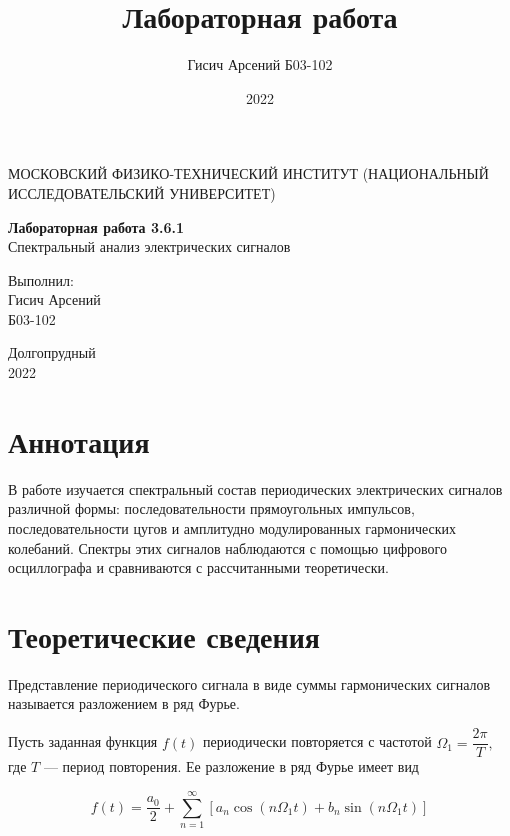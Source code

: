 \documentclass[a4paper, 12pt]{article}
\title{Лабораторная работа}
\author{Гисич Арсений Б03-102}
\date{2022}
\begin{document}
	\begin{center}
		{\large МОСКОВСКИЙ ФИЗИКО-ТЕХНИЧЕСКИЙ ИНСТИТУТ (НАЦИОНАЛЬНЫЙ ИССЛЕДОВАТЕЛЬСКИЙ УНИВЕРСИТЕТ)}
	\end{center}
	\vspace{5 cm}
	{\Large
		\begin{center}
			{\bf Лабораторная работа 3.6.1}\\[0.2 cm]
			Спектральный анализ электрических сигналов
		\end{center}
	}
	\vspace{4 cm}
	\begin{flushright}
		{\Large Выполнил: \\
			\vspace{0.2 cm}
			Гисич Арсений \\
			\vspace{0.2 cm}
			Б03-102 \\}
	\end{flushright}
	\vspace{9 cm}
	\begin{center}
		Долгопрудный\\[0.1 cm]
		2022
	\end{center}
\thispagestyle{empty}

\section{Аннотация}

В работе изучается спектральный состав периодических электрических сигналов различной формы: последовательности прямоугольных импульсов, последовательности цугов и амплитудно модулированных гармонических колебаний. Спектры этих сигналов наблюдаются с помощью цифрового осциллографа и сравниваются с рассчитанными теоретически. 

\section{Теоретические сведения}

Представление периодического сигнала в виде суммы гармонических сигналов называется разложением в ряд Фурье.
	
Пусть заданная функция $f(t)$ периодически повторяется с частотой $\Omega_{1}=\dfrac{2\pi}{T},$ где $T$ --- период повторения. Ее разложение в ряд Фурье имеет вид
	
$$ f(t)=\dfrac{a_{0}}{2}+ \sum\limits_{n=1}^\infty [a_{n}\cos(n \Omega_{1}t)+b_{n}\sin(n \Omega_{1} t) ]$$
	
\end{document}
